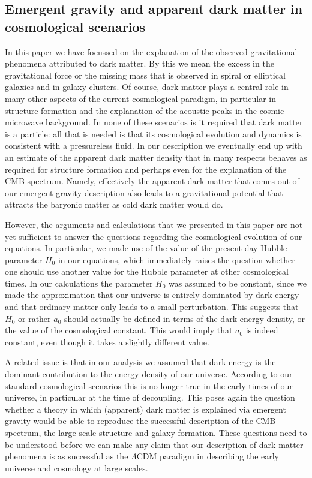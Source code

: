 \documentclass[a4paper,12pt]{article}
\begin{document}
\subsection{Emergent gravity and apparent dark matter in cosmological scenarios}


In this paper we have focussed on the explanation of the observed gravitational phenomena attributed to dark matter. By this we mean the excess in the gravitational force or the missing mass that is observed in spiral or elliptical galaxies and in galaxy clusters. Of course, dark matter plays a central role in many other aspects of the current cosmological paradigm, in particular in structure formation and the explanation of the acoustic peaks in the cosmic microwave background. In none of these scenarios is it required that dark matter is   a particle: all that is needed is that its cosmological evolution and dynamics is consistent with a pressureless fluid. In our description we eventually end up with an estimate of the apparent dark matter density that in many respects behaves as required for structure formation and perhaps even for the explanation of the CMB spectrum. Namely, effectively the apparent dark matter that comes out of our emergent gravity description also leads to a gravitational  potential that attracts the baryonic matter as cold dark matter would do. 

However, the arguments and calculations that we presented in this paper are not yet sufficient  to answer the questions regarding the cosmological evolution of our equations. In particular, we   made use of the value of the present-day Hubble parameter $H_0$ in our equations, which  immediately raises the question whether one should use another value for the Hubble parameter at other cosmological times. In our calculations the parameter $H_0$ was assumed to be constant, since we made the approximation that our universe is entirely dominated by dark energy and that ordinary matter only leads to a small perturbation. This suggests that $H_0$ or rather $a_0$ should actually be defined in terms of the dark energy density, or the value of the cosmological constant.  This would imply that $a_0$ is indeed  constant, even though it takes a slightly different value. 

A related issue is that in our analysis we assumed that dark energy is the dominant contribution to the energy density of our universe. According to our standard cosmological scenarios this is no longer true in the early times of our universe, in particular at the time of decoupling.  This poses again the question whether a theory in which   (apparent) dark matter is explained via emergent gravity would be able to reproduce the successful description of the CMB spectrum, the large scale structure and galaxy formation. These questions need to be understood before we can make any claim that our description of dark matter phenomena is as successful as the $\Lambda$CDM paradigm in describing the early universe and cosmology at large scales.  
\end{document}
